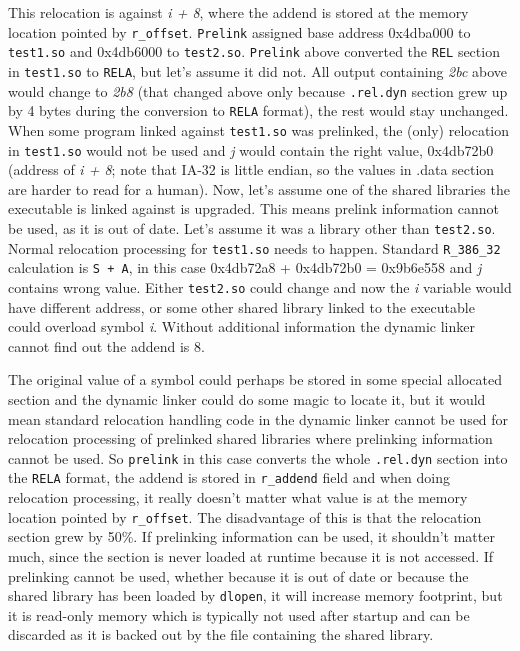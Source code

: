 \documentclass[twoside]{article}
\def\tts#1{\texttt{\small #1}}
\begin{document}
This relocation is against {\sl i + 8}, where the addend is stored at the memory
location pointed by \tts{r\_offset}.  \tts{Prelink} assigned base address
0x4dba000 to \tts{test1.so} and 0x4db6000 to \tts{test2.so}.
\tts{Prelink} above converted the \tts{REL} section in \tts{test1.so} to
\tts{RELA}, but let's assume it did not.  All output containing {\sl 2bc}
above would change to {\sl 2b8} (that changed above only because \tts{.rel.dyn}
section grew up by 4 bytes during the conversion to \tts{RELA} format),
the rest would stay unchanged.
When some program linked against \tts{test1.so} was prelinked,
the (only) relocation in \tts{test1.so} would not be used and {\sl j} would
contain the right value, 0x4db72b0 (address of {\sl i + 8}; note that IA-32
is little endian, so the values in .data section are harder to read
for a human).  Now, let's assume one of the shared libraries the executable
is linked against is upgraded.  This means prelink information cannot
be used, as it is out of date.  Let's assume it was a library other
than \tts{test2.so}.  Normal relocation processing for \tts{test1.so}
needs to happen.  Standard \tts{R\_386\_32} calculation is \tts{S~+~A},
in this case 0x4db72a8 + 0x4db72b0 = 0x9b6e558 and {\sl j} contains wrong
value.  Either \tts{test2.so} could change and now the {\sl i} variable would
have different address, or some other shared library linked to the executable
could overload symbol {\sl i}.  Without additional information the dynamic
linker cannot find out the addend is 8.

The original value of a symbol could perhaps be stored in some special
allocated section and the dynamic linker could do some magic to locate it,
but it would mean standard relocation handling code in the dynamic linker
cannot be used for relocation processing of prelinked shared libraries
where prelinking information cannot be used.
So \tts{prelink} in this case converts the whole \tts{.rel.dyn} section
into the \tts{RELA} format, the addend is stored in \tts{r\_addend} field
and when doing relocation processing, it really doesn't matter what
value is at the memory location pointed by \tts{r\_offset}.
The disadvantage of this is that the relocation section
grew by 50\%.  If prelinking information can be used, it shouldn't matter much,
since the section is never loaded at runtime because it is not accessed.
If prelinking cannot be used, whether because it is out of date or
because the shared library has been
loaded by \tts{dlopen}, it will increase memory footprint, but it is read-only
memory which is typically not used after startup and can be discarded
as it is backed out by the file containing the shared library.
\end{document}
